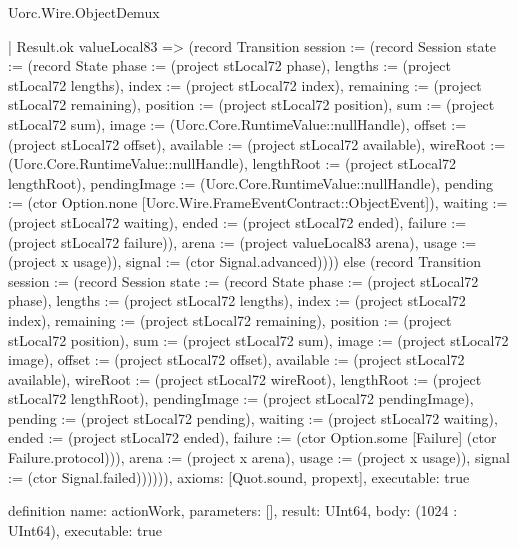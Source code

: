\begin{lexlean}{Uorc.Wire.ObjectDemux}
\begin{semanticmodule}
{      | Result.ok valueLocal83 => (record Transition {session := (record Session {state := (record State {phase := (project stLocal72 phase), lengths := (project stLocal72 lengths), index := (project stLocal72 index), remaining := (project stLocal72 remaining), position := (project stLocal72 position), sum := (project stLocal72 sum), image := (Uorc.Core.RuntimeValue::nullHandle), offset := (project stLocal72 offset), available := (project stLocal72 available), wireRoot := (Uorc.Core.RuntimeValue::nullHandle), lengthRoot := (project stLocal72 lengthRoot), pendingImage := (Uorc.Core.RuntimeValue::nullHandle), pending := (ctor Option.none [Uorc.Wire.FrameEventContract::ObjectEvent]), waiting := (project stLocal72 waiting), ended := (project stLocal72 ended), failure := (project stLocal72 failure)}), arena := (project valueLocal83 arena), usage := (project x usage)}), signal := (ctor Signal.advanced)}))) else (record Transition {session := (record Session {state := (record State {phase := (project stLocal72 phase), lengths := (project stLocal72 lengths), index := (project stLocal72 index), remaining := (project stLocal72 remaining), position := (project stLocal72 position), sum := (project stLocal72 sum), image := (project stLocal72 image), offset := (project stLocal72 offset), available := (project stLocal72 available), wireRoot := (project stLocal72 wireRoot), lengthRoot := (project stLocal72 lengthRoot), pendingImage := (project stLocal72 pendingImage), pending := (project stLocal72 pending), waiting := (project stLocal72 waiting), ended := (project stLocal72 ended), failure := (ctor Option.some [Failure] (ctor Failure.protocol))}), arena := (project x arena), usage := (project x usage)}), signal := (ctor Signal.failed)}))))),
  axioms: [Quot.sound, propext],
  executable: true
}

definition{
  name: actionWork,
  parameters: [],
  result: UInt64,
  body: (1024 : UInt64),
  executable: true
}


\end{semanticmodule}
\end{lexlean}
